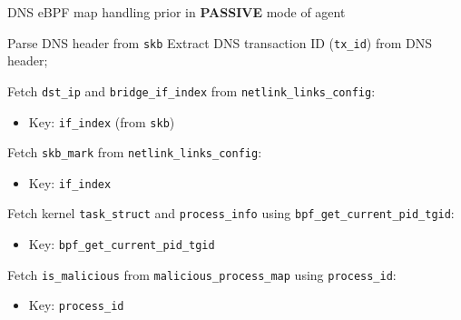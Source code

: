 \documentclass [11pt, proquest] {uwthesis}[2020/02/24]
\begin{document}
\begin{algorithm}[H]
\caption{DNS eBPF map handling prior  in \textbf{PASSIVE} mode of agent}
\label{sec:alg5}

\small %




Parse DNS header from \texttt{skb}\;
Extract DNS transaction ID (\texttt{tx\_id}) from DNS header;

Fetch \texttt{dst\_ip} and \texttt{bridge\_if\_index} from \texttt{netlink\_links\_config}:
\begin{itemize}[nosep]
    \item Key: \texttt{if\_index} (from \texttt{skb})
\end{itemize}
Fetch \texttt{skb\_mark} from \texttt{netlink\_links\_config}:
\begin{itemize}[nosep]
    \item Key: \texttt{if\_index}
\end{itemize}

Fetch kernel \texttt{task\_struct} and \texttt{process\_info} using \texttt{bpf\_get\_current\_pid\_tgid}:
\begin{itemize}[nosep]
    \item Key: \texttt{bpf\_get\_current\_pid\_tgid}
\end{itemize}

Fetch \texttt{is\_malicious} from \texttt{malicious\_process\_map} using \texttt{process\_id}:
\begin{itemize}[nosep]
    \item Key: \texttt{process\_id}
\end{itemize}


\end{algorithm}
\end{document}
